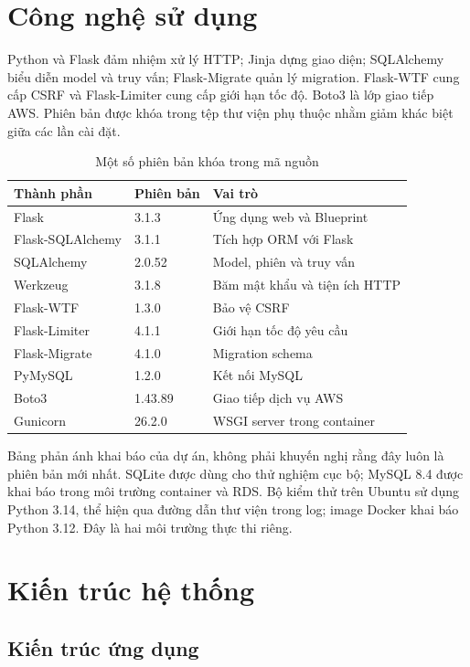 \section{Công nghệ sử dụng}
Python và Flask đảm nhiệm xử lý HTTP; Jinja dựng giao diện; SQLAlchemy biểu diễn model và truy vấn; Flask-Migrate quản lý migration. Flask-WTF cung cấp CSRF và Flask-Limiter cung cấp giới hạn tốc độ. Boto3 là lớp giao tiếp AWS. Phiên bản được khóa trong tệp thư viện phụ thuộc nhằm giảm khác biệt giữa các lần cài đặt.
\begin{table}[htbp]\centering\small
\caption{Một số phiên bản khóa trong mã nguồn}
\begin{tabularx}{\textwidth}{P{3.5cm}P{2.5cm}X}\toprule
\textbf{Thành phần}&\textbf{Phiên bản}&\textbf{Vai trò}\\\midrule
Flask & 3.1.3 & Ứng dụng web và Blueprint\\
Flask-SQLAlchemy & 3.1.1 & Tích hợp ORM với Flask\\
SQLAlchemy & 2.0.52 & Model, phiên và truy vấn\\
Werkzeug & 3.1.8 & Băm mật khẩu và tiện ích HTTP\\
Flask-WTF & 1.3.0 & Bảo vệ CSRF\\
Flask-Limiter & 4.1.1 & Giới hạn tốc độ yêu cầu\\
Flask-Migrate & 4.1.0 & Migration schema\\
PyMySQL & 1.2.0 & Kết nối MySQL\\
Boto3 & 1.43.89 & Giao tiếp dịch vụ AWS\\
Gunicorn & 26.2.0 & WSGI server trong container\\\bottomrule
\end{tabularx}\end{table}
Bảng phản ánh khai báo của dự án, không phải khuyến nghị rằng đây luôn là phiên bản mới nhất. SQLite được dùng cho thử nghiệm cục bộ; MySQL 8.4 được khai báo trong môi trường container và RDS. Bộ kiểm thử trên Ubuntu sử dụng Python 3.14, thể hiện qua đường dẫn thư viện trong log; image Docker khai báo Python 3.12. Đây là hai môi trường thực thi riêng.

\section{Kiến trúc hệ thống}
\subsection{Kiến trúc ứng dụng}

